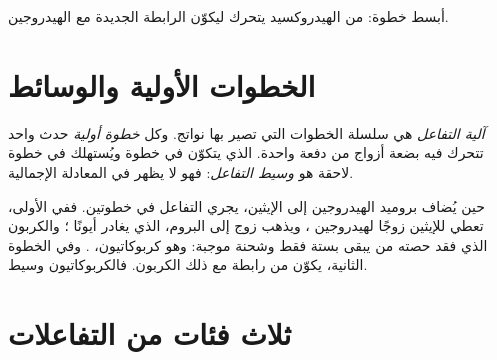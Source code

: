 \begin{omfigure}

{\small أبسط خطوة:  من  الهيدروكسيد يتحرك ليكوّن
الرابطة الجديدة  مع  الهيدروجين.}
\end{omfigure}

\section{الخطوات الأولية والوسائط}

\begin{definition}\label{def:g12:curly-arrows:mechanism}
\emph{آلية التفاعل} هي
سلسلة الخطوات التي تصير بها  نواتج. وكل
\emph{خطوة أولية} حدث واحد تتحرك فيه
بضعة أزواج من  دفعة واحدة.  الذي يتكوّن في خطوة
ويُستهلك في خطوة لاحقة هو \emph{وسيط التفاعل}:
فهو لا يظهر في المعادلة الإجمالية.
\end{definition}


\begin{example}\label{ex:g12:curly-arrows:carbocation}
حين يُضاف بروميد الهيدروجين إلى الإيثين، يجري التفاعل في خطوتين. ففي
الأولى، تعطي  للإيثين زوجًا لهيدروجين
، ويذهب زوج  إلى البروم، الذي يغادر
أيونًا ؛ والكربون الذي فقد حصته من  يبقى
بستة  فقط وشحنة موجبة: وهو كربوكاتيون،
. وفي الخطوة الثانية، يكوّن  من  رابطة
مع ذلك الكربون. فالكربوكاتيون وسيط.
\end{example}

\section{ثلاث فئات من التفاعلات}

